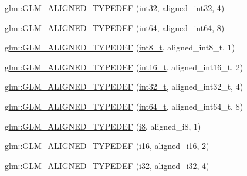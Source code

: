 \begin{DoxyCompactItemize}
\item 
\mbox{\hyperlink{group__gtx__type__aligned_ga07732da630b2deda428ce95c0ecaf3ff}{glm\+::\+G\+L\+M\+\_\+\+A\+L\+I\+G\+N\+E\+D\+\_\+\+T\+Y\+P\+E\+D\+EF}} (\mbox{\hyperlink{group__gtc__type__precision_ga632d8b25f6b61659f39ea4321fab92a4}{int32}}, aligned\+\_\+int32, 4)
\item 
\mbox{\hyperlink{group__gtx__type__aligned_ga1a8da2a8c51f69c07a2e7f473aa420f4}{glm\+::\+G\+L\+M\+\_\+\+A\+L\+I\+G\+N\+E\+D\+\_\+\+T\+Y\+P\+E\+D\+EF}} (\mbox{\hyperlink{group__gtc__type__precision_ga435d75819cce297cc5fa21bd84ef89a5}{int64}}, aligned\+\_\+int64, 8)
\item 
\mbox{\hyperlink{group__gtx__type__aligned_ga848aedf13e2d9738acf0bb482c590174}{glm\+::\+G\+L\+M\+\_\+\+A\+L\+I\+G\+N\+E\+D\+\_\+\+T\+Y\+P\+E\+D\+EF}} (\mbox{\hyperlink{group__gtc__type__precision_ga673898d450b2a91186f3c4f40c5f8633}{int8\+\_\+t}}, aligned\+\_\+int8\+\_\+t, 1)
\item 
\mbox{\hyperlink{group__gtx__type__aligned_gafd2803d39049dd45a37a63931e25d943}{glm\+::\+G\+L\+M\+\_\+\+A\+L\+I\+G\+N\+E\+D\+\_\+\+T\+Y\+P\+E\+D\+EF}} (\mbox{\hyperlink{group__gtc__type__precision_gaf89ee61e0d34aa4a462104b7ae7f2da6}{int16\+\_\+t}}, aligned\+\_\+int16\+\_\+t, 2)
\item 
\mbox{\hyperlink{group__gtx__type__aligned_gae553b33349d6da832cf0724f1e024094}{glm\+::\+G\+L\+M\+\_\+\+A\+L\+I\+G\+N\+E\+D\+\_\+\+T\+Y\+P\+E\+D\+EF}} (\mbox{\hyperlink{group__gtc__type__precision_gab870c0eb6f525b0c8c4716762e0fc3a8}{int32\+\_\+t}}, aligned\+\_\+int32\+\_\+t, 4)
\item 
\mbox{\hyperlink{group__gtx__type__aligned_ga16d223a2b3409e812e1d3bd87f0e9e5c}{glm\+::\+G\+L\+M\+\_\+\+A\+L\+I\+G\+N\+E\+D\+\_\+\+T\+Y\+P\+E\+D\+EF}} (\mbox{\hyperlink{group__gtc__type__precision_ga6abb23fbf4e39c50ec5341160b5da5ab}{int64\+\_\+t}}, aligned\+\_\+int64\+\_\+t, 8)
\item 
\mbox{\hyperlink{group__gtx__type__aligned_ga2de065d2ddfdb366bcd0febca79ae2ad}{glm\+::\+G\+L\+M\+\_\+\+A\+L\+I\+G\+N\+E\+D\+\_\+\+T\+Y\+P\+E\+D\+EF}} (\mbox{\hyperlink{group__gtc__type__precision_gaae064be68b7d36cd7910c16e8ad18bba}{i8}}, aligned\+\_\+i8, 1)
\item 
\mbox{\hyperlink{group__gtx__type__aligned_gabd786bdc20a11c8cb05c92c8212e28d3}{glm\+::\+G\+L\+M\+\_\+\+A\+L\+I\+G\+N\+E\+D\+\_\+\+T\+Y\+P\+E\+D\+EF}} (\mbox{\hyperlink{group__gtc__type__precision_ga35e5542ca05b29cc256fdafb8503d1fd}{i16}}, aligned\+\_\+i16, 2)
\item 
\mbox{\hyperlink{group__gtx__type__aligned_gad4aefe56691cdb640c72f0d46d3fb532}{glm\+::\+G\+L\+M\+\_\+\+A\+L\+I\+G\+N\+E\+D\+\_\+\+T\+Y\+P\+E\+D\+EF}} (\mbox{\hyperlink{group__gtc__type__precision_ga1d8ed5c43e91ea7d4528389da4fa9524}{i32}}, aligned\+\_\+i32, 4)

\end{DoxyCompactItemize}
